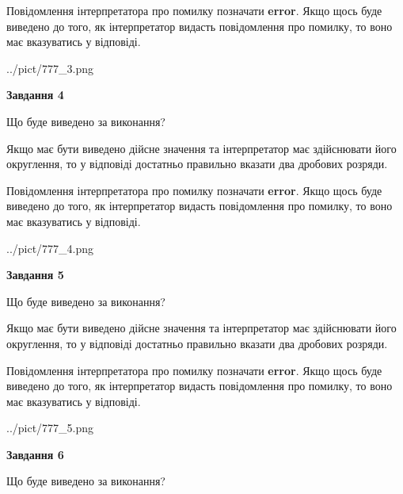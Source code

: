 \documentclass[12pt, ukrainian]{article}
\begin{document}
{\begin {Large}
Повідомлення інтерпретатора про помилку позначати \textbf{error}.
Якщо щось буде виведено до того, як інтерпретатор видасть повідомлення про помилку, 
то воно має вказуватись у відповіді. \par

\begin{center}
	{../pict/777_3.png}
\end{center}
\newpage

{\begin {center}\textbf{Завдання 4}\end {center}}\par
Що буде виведено за виконання? \par

Якщо має бути виведено дійсне значення та інтерпретатор має здійснювати його округлення, 
то у відповіді достатньо правильно вказати два дробових розряди.

Повідомлення інтерпретатора про помилку позначати \textbf{error}.
Якщо щось буде виведено до того, як інтерпретатор видасть повідомлення про помилку, 
то воно має вказуватись у відповіді. \par

\begin{center}
	{../pict/777_4.png}
\end{center}
\newpage

{\begin {center}\textbf{Завдання 5}\end {center}}\par
Що буде виведено за виконання? \par

Якщо має бути виведено дійсне значення та інтерпретатор має здійснювати його округлення, 
то у відповіді достатньо правильно вказати два дробових розряди.

Повідомлення інтерпретатора про помилку позначати \textbf{error}.
Якщо щось буде виведено до того, як інтерпретатор видасть повідомлення про помилку, 
то воно має вказуватись у відповіді. \par

\begin{center}
	{../pict/777_5.png}
\end{center}
\newpage

{\begin {center}\textbf{Завдання 6}\end {center}}\par
Що буде виведено за виконання? \par


\end{Large}}
\end{document}
